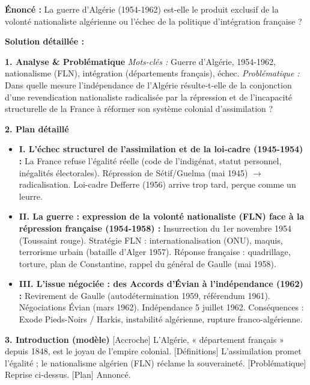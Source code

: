\documentclass[11pt]{article}
\newcommand{\cle}[1]{{\popxbold\color{popdark}#1}}
\begin{document}
\begin{exoresolu}
\textbf{Énoncé :} \guillemotleft La guerre d'Algérie (1954-1962) est-elle le produit exclusif de la volonté nationaliste algérienne ou l'échec de la politique d'intégration française ? \guillemotright

\tcblower
\textbf{Solution détaillée :}

\textbf{1. Analyse \& Problématique}
\emph{Mots-clés :} Guerre d'Algérie, 1954-1962, nationalisme (FLN), intégration (départements français), échec.
\emph{Problématique :} Dans quelle mesure l'indépendance de l'Algérie résulte-t-elle de la conjonction d'une revendication nationaliste radicalisée par la répression et de l'incapacité structurelle de la France à réformer son système colonial d'assimilation ?

\textbf{2. Plan détaillé}
\begin{itemize}
    \item \textbf{I. L'échec structurel de l'\cle{assimilation} et de la \cle{loi-cadre} (1945-1954) :} La France refuse l'égalité réelle (code de l'indigénat, statut personnel, inégalités électorales). Répression de Sétif/Guelma (mai 1945) $\to$ radicalisation. Loi-cadre Defferre (1956) arrive trop tard, perçue comme un leurre.
    \item \textbf{II. La guerre : expression de la volonté nationaliste (FLN) face à la répression française (1954-1958) :} Insurrection du 1er novembre 1954 (\cle{Toussaint rouge}). Stratégie FLN : internationalisation (ONU), maquis, terrorisme urbain (bataille d'Alger 1957). Réponse française : \cle{quadrillage}, torture, \cle{plan de Constantine}, rappel du général de Gaulle (mai 1958).
    \item \textbf{III. L'issue négociée : des Accords d'Évian à l'indépendance (1962) :} Revirement de Gaulle (autodétermination 1959, référendum 1961). Négociations Évian (mars 1962). Indépendance 5 juillet 1962. Conséquences : Exode \cle{Pieds-Noirs} / \cle{Harkis}, instabilité algérienne, rupture franco-algérienne.
\end{itemize}

\textbf{3. Introduction (modèle)}
[Accroche] L'Algérie, « département français » depuis 1848, est le joyau de l'empire colonial. [Définitions] L'assimilation promet l'égalité ; le nationalisme algérien (FLN) réclame la souveraineté. [Problématique] Reprise ci-dessus. [Plan] Annoncé.


\end{exoresolu}
\end{document}
